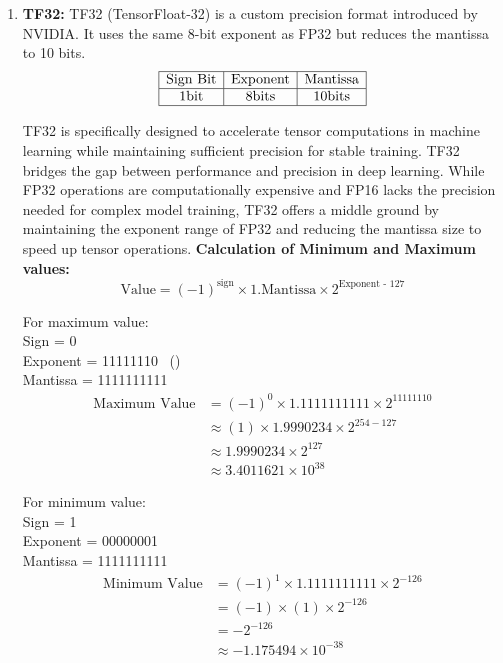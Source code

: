 \documentclass{ioereport}
\begin{document}
\begin{enumerate}[label=\textbf{\roman*.}]
    \item \textbf{TF32:}
    TF32 (TensorFloat-32) is a custom precision format introduced by NVIDIA. It uses the same 8-bit exponent as FP32 but reduces the mantissa to 10 bits.
    \[
    \begin{array}{|c|c|c|}
        \hline
        \text{Sign Bit} & \text{Exponent} & \text{Mantissa} \\
        \hline
        1 \text{bit} & 8 \text{bits} & 10 \text{bits} \\
        \hline
    \end{array}
    \]

    TF32 is specifically designed to accelerate tensor computations in machine learning while maintaining sufficient precision for stable training. TF32 bridges the gap between performance and precision in deep learning. While FP32 operations are computationally expensive and FP16 lacks the precision needed for complex model training, TF32 offers a middle ground by maintaining the exponent range of FP32 and reducing the mantissa size to speed up tensor operations.
    \textbf{Calculation of Minimum and Maximum values:} 
    \[
        \text{Value} = (-1)^{\text{sign}} \times 1.\text{Mantissa} \times 2^{\text{Exponent - 127}}
    \]

    For maximum value:\\
    Sign = 0 \\
    Exponent = 11111110 \ () \\
    Mantissa = 1111111111
    \[
        \begin{aligned}
            \text{Maximum Value} &= (-1)^{0} \times 1.1111111111 \times 2^{11111110} \\
            & \approx (1) \times 1.9990234 \times 2^{254 - 127} \\
            & \approx 1.9990234 \times 2^{127} \\
            & \approx 3.4011621 \times 10^{38}
        \end{aligned}
    \]

    For minimum value:\\

    Sign = 1 \\
    Exponent = 00000001 \\
    Mantissa = 1111111111
    \[
        \begin{aligned}
            \text{Minimum Value} &= (-1)^{1} \times 1.1111111111 \times 2^{-126} \\
            & = (-1) \times (1) \times 2^{-126} \\
            & =  -2^{-126} \\
            & \approx -1.175494 \times 10^{-38}
        \end{aligned}
    \]


\end{enumerate}
\end{document}
